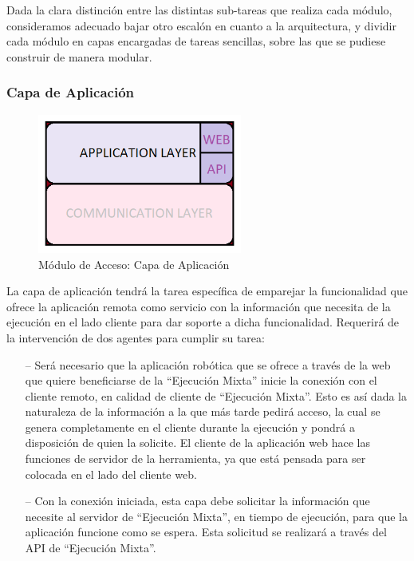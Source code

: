 Dada la clara distinción entre las distintas sub-tareas que realiza cada módulo, consideramos adecuado bajar otro escalón en cuanto a la arquitectura, y dividir cada módulo en capas encargadas de tareas sencillas, sobre las que se pudiese construir de manera modular. 

\subsubsection{Capa de Aplicación}

\begin{figure}[!hbtp]  \centering\noindent
    \includegraphics[width=0.6\textwidth]{figures/layer4.png}
    \caption{Módulo de Acceso: Capa de Aplicación}
    \label{layer4}
\end{figure}

La capa de aplicación tendrá la tarea específica de emparejar la funcionalidad que ofrece la aplicación remota como servicio con la información que necesita de la ejecución en el lado cliente para dar soporte a dicha funcionalidad. Requerirá de la intervención de dos agentes para cumplir su tarea:

\begin{itemize}
    \item [--] Será necesario que la aplicación robótica que se ofrece a través de la web que quiere beneficiarse de la ``Ejecución Mixta'' inicie la conexión con el cliente remoto, en calidad de cliente de ``Ejecución Mixta''. Esto es así dada la naturaleza de la información a la que más tarde pedirá acceso, la cual se genera completamente en el cliente durante la ejecución y pondrá a disposición de quien la solicite. El cliente de la aplicación web hace las funciones de servidor de la herramienta, ya que está pensada para ser colocada en el lado del cliente web.
    \item [--] Con la conexión iniciada, esta capa debe solicitar la información que necesite al servidor de ``Ejecución Mixta'', en tiempo de ejecución, para que la aplicación funcione como se espera. Esta solicitud se realizará a través del API de ``Ejecución Mixta''.
\end{itemize}


